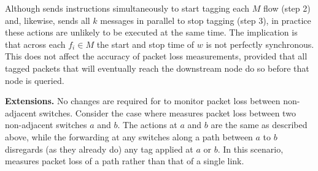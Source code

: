 
Although \pcnt sends instructions simultaneously to start tagging each $M$ flow (step 2) and, likewise, sends all $k$ messages in parallel to stop tagging (step 3), in practice
these actions are unlikely to be executed at the same time. %
The implication is that across each $f_i \in M$ the start and stop time of $w$ is not perfectly synchronous.  This does not affect the accuracy of \pcnt packet loss measurements,
provided that all tagged packets that will eventually reach the downstream node do so before that node is queried.



{\bf \pcnt Extensions.} 
No changes are required for \pcnt to monitor packet loss between non-adjacent switches. Consider the case where \pcnt 
measures packet loss between two non-adjacent switches $a$ and $b$.  The \pcnt actions at $a$ and $b$ are the same as described above, while the forwarding at any switches along
a path between $a$ to $b$ disregards (as they already do) any tag applied at $a$ or $b$.  In this scenario, \pcnt measures packet loss of a path rather than that of a single link.

